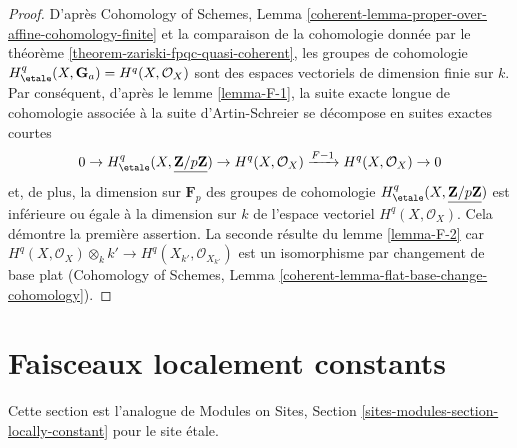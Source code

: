 \begin{proof}
D'apr\`es Cohomology of Schemes, Lemma
\ref{coherent-lemma-proper-over-affine-cohomology-finite}
et la comparaison de la cohomologie donn\'ee par le
th\'eor\`eme \ref{theorem-zariski-fpqc-quasi-coherent}, les groupes de cohomologie
$H^q_\etale(X, \mathbf{G}_a) = H^q(X, \mathcal{O}_X)$ sont
des espaces vectoriels de dimension finie sur $k$. Par cons\'equent, d'apr\`es le
lemme \ref{lemma-F-1}, la suite exacte longue de cohomologie
associ\'ee \`a la suite d'Artin-Schreier se d\'ecompose en
suites exactes courtes
$$
0 \to H_\etale^q(X, \underline{\mathbf{Z}/p\mathbf{Z}}) \to
H^q(X, \mathcal{O}_X) \xrightarrow{F - 1} H^q(X, \mathcal{O}_X) \to 0
$$
et, de plus, la dimension sur $\mathbf{F}_p$ des groupes de cohomologie
$H_\etale^q(X, \underline{\mathbf{Z}/p\mathbf{Z}})$ est inf\'erieure ou \'egale \`a la
dimension sur $k$ de l'espace vectoriel $H^q(X, \mathcal{O}_X)$.
Cela d\'emontre la premi\`ere assertion. La seconde r\'esulte
du lemme \ref{lemma-F-2}
car $H^q(X, \mathcal{O}_X) \otimes_k k' \to H^q(X_{k'}, \mathcal{O}_{X_{k'}})$
est un isomorphisme par changement de base plat
(Cohomology of Schemes,
Lemma \ref{coherent-lemma-flat-base-change-cohomology}).
\end{proof}








\section{Faisceaux localement constants}
\label{section-locally-constant}

\noindent
Cette section est l'analogue de
Modules on Sites, Section \ref{sites-modules-section-locally-constant}
pour le site \'etale.

